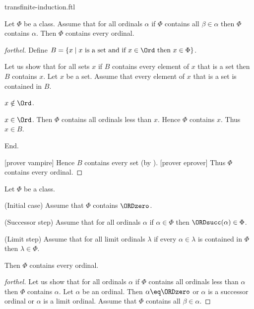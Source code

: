 \documentclass{naproche-library}
\begin{document}
\begin{smodule}[title=Transfinite Induction]{transfinite-induction.ftl}

\begin{theorem}[forthel,id=SET_THEORY_02_8493935460614144]
  Let $\Phi$ be a class.
  Assume that for all ordinals $\alpha$ if $\Phi$ contains all $\beta \in \alpha$ then $\Phi$ contains $\alpha$.
  Then $\Phi$ contains every ordinal.
\end{theorem}
\begin{proof}[forthel]
  Define $B = \{ x \mid x\text{ is a set and if }x \in \Ord\text{ then }x \in \Phi \}$.

  Let us show that for all sets $x$ if $B$ contains every element of $x$ that is a set then $B$ contains $x$.
    Let $x$ be a set.
    Assume that every element of $x$ that is a set is contained in $B$.

    \begin{case}{$x \notin \Ord$.} \end{case}

    \begin{case}{$x \in \Ord$.}
      Then $\Phi$ contains all ordinals less than $x$.
      Hence $\Phi$ contains $x$.
      Thus $x \in B$.
    \end{case}
  End.

  [prover vampire]
  Hence $B$ contains every set (by ).
  [prover eprover]
  Thus $\Phi$ contains every ordinal.
\end{proof}

\begin{theorem}[forthel,id=SET_THEORY_02_7892040431960064]
  Let $\Phi$ be a class.
  
  (Initial case) Assume that $\Phi$ contains $\ORDzero$.
  
  (Successor step) Assume that for all ordinals $\alpha$ if $\alpha \in \Phi$ then $\ORDsucc(\alpha) \in \Phi$.
  
  (Limit step) Assume that for all limit ordinals $\lambda$ if every $\alpha \in \lambda$ is contained in $\Phi$ then $\lambda \in \Phi$.
  
  Then $\Phi$ contains every ordinal.
\end{theorem}
\begin{proof}[forthel]
  Let us show that for all ordinals $\alpha$ if $\Phi$ contains all ordinals
  less than $\alpha$ then $\Phi$ contains $\alpha$.
    Let $\alpha$ be an ordinal.
    Then $\alpha \eq \ORDzero$ or $\alpha$ is a successor ordinal or $\alpha$ is a
    limit ordinal.
    Assume that $\Phi$ contains all $\beta \in \alpha$.


\end{proof}
\end{smodule}
\end{document}
